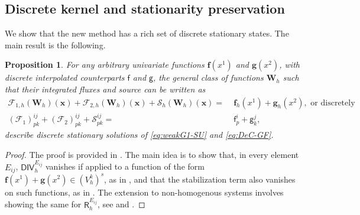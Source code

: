 \documentclass[a4paper,10pt]{article}
\newtheorem{proposition}[theorem]{Proposition}
\begin{document}
%
%

\subsection{Discrete kernel and stationarity preservation}
We show that the new method has a rich set of discrete stationary states. 
 The main result is   the following.


\begin{proposition}\label{prop:equilibria}
For any arbitrary  univariate functions $\mathbf{f}(x^1)$ and $\mathbf{g}(x^2)$, with discrete interpolated counterparts $\mathsf{f}$ and $\mathsf{g}$,
the general class of functions $\mathbf{W}_h$ such that their integrated fluxes and source can be written as 
\begin{equation}\label{eq:equilibria}
	\begin{split}
	 \mathcal{F}_{1,h}(\mathbf{W}_h)(\mathbf{x}) + \mathcal{F}_{2,h}(\mathbf{W}_h)(\mathbf{x}) + \mathcal{S}_h(\mathbf{W}_h)(\mathbf{x}) = &\; \mathbf{f}_h(x^1)+\mathbf{g}_h(x^2) , \text { or discretely}\\[5pt]
		(\mathcal{F}_{1})^{ij}_{pk} + (\mathcal{F}_{2})^{ij}_{pk} + \mathcal{S}^{ij}_{pk} =& \; \mathsf{f}^i_p + \mathsf{g}^j_k,
	\end{split}
\end{equation} 
describe discrete stationary solutions of \eqref{eq:weakG1-SU} and \eqref{eq:DeC-GF}.
\end{proposition}
\begin{proof}
The proof is provided in \cite{barsukow2025structure,barsukow2025stationaritypreservingnodalfinite}. The main
idea is to  show that, in every element $E_{ij}$,  $\textsf{DIV}_h^{E_{ij}}$ vanishes if   applied to a function of the form $\mathbf{f}(x^1)+\mathbf{g}(x^2) \in (V_h^k)^s$, as in \cite[Proposition 5]{barsukow2025structure}, and that the stabilization term also vanishes on such functions, as in \cite[Proposition  10]{barsukow2025structure}. The extension to non-homogenous systems involves showing the same for  $\mathsf{R}_h^{E_{ij}}$, see \cite[Proposition 5]{barsukow2025stationaritypreservingnodalfinite} and 
\cite[Proposition 8]{barsukow2025stationaritypreservingnodalfinite}. 
\end{proof}
\end{document}
